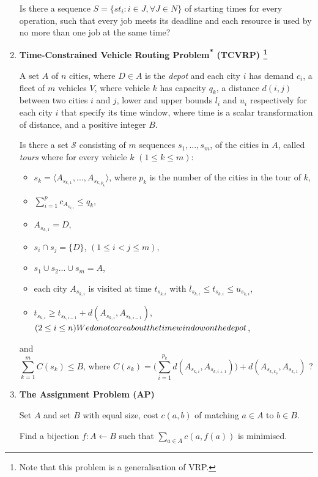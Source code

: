 \documentclass{mprop}
\theoremstyle{definition}
\begin{document}
\begin{enumerate}
\begin{question}
Is there a sequence $S = \{st_{i} : i \in J, \forall J \in N\}$ of starting times for every operation, such that every job meets its deadline and each resource is used by no more than one job at the same time?
\end{question}

\item \textbf{Time-Constrained Vehicle Routing Problem\textsuperscript{*}
(TCVRP) \footnote{Note that this problem is a generalisation of VRP.}}
\begin{instance}
A set $A$ of $n$ cities, where $D \in A$ is the \textit{depot} and each city $i$ has demand $c_{i}$, a fleet of $m$ vehicles $V$, where vehicle $k$ has capacity $q_{k}$, a distance $d(i,j)$ between two cities $i$ and $j$, lower and upper bounds $l_{i}$ and $u_{i}$ respectively for each city $i$ that specify its time window, where time is a scalar transformation of distance, and a positive integer $B$.
\end{instance}

\begin{question}
\color{red}
Is there a set $\mathcal{S}$ consisting of $m$ sequences $s_{1},...,s_{m}$, of the cities in $A$, called \textit{tours}
where for every vehicle $k$ $(1 \leq k \leq m)$:
\begin{itemize}
\item $s_{k} = \langle A_{s_{k,1}},...,A_{s_{k,p_{k}}} \rangle$, \quad where $p_{k}$ is the number of the cities in the tour of $k$,
\item $\sum_{i = 1}^{p} c_{A_{s_{k,i}}} \leq q_{k}$,
\item $A_{s_{k,1}} = D$,
\item $s_{i} \cap s_{j} = \{D\}$, \quad $(1 \leq i < j \leq m),$
\item $s_{1} \cup s_{2} ... \cup s_{m} = A$,
\item each city $A_{s_{k,i}}$ is visited at time $t_{s_{k,i}}$ with $l_{s_{k,i}} \leq t_{s_{k,i}} \leq u_{s_{k,i}}$,
\item $t_{s_{k,i}} \geq t_{s_{k,i-1}} + d(A_{s_{k,i}},A_{s_{k,i-1}})$, \quad $(2 \leq i \leq n) \footnote{We do not care about the time window on the depot}$,
\end{itemize}
and
$$ \sum_{k=1}^{m} C(s_{k}) \leq B \textrm{, where } C(s_{k}) = \bigg( \sum_{i=1}^{p_{k}} d(A_{s_{k,i}}, A_{s_{k,i+1}}) \bigg) + d(A_{s_{k,k_{p}}}, A_{s_{k,1}}) \textrm{ ?}$$
\end{question}

\item \textbf{The Assignment Problem (AP)}
\begin{instance}
Set $A$ and set $B$ with equal size, cost $c(a,b)$ of matching $a \in A$ to $b \in B$.
\end{instance}

\begin{question}
Find a bijection $f: A \gets B$ such that $\sum_{a\in A} c(a,f(a))$ is minimised.
\end{question}

\end{enumerate}
\end{document}
